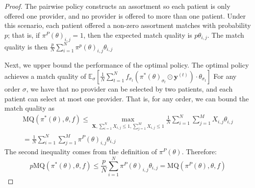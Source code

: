 \documentclass[11pt]{article}
\begin{document}
\begin{proof}
     
    The pairwise policy constructs an assortment so each patient is only offered one provider, and no provider is offered to more than one patient. 
    Under this scenario, each patient offered a non-zero assortment matches with probability $p$; that is, if $\pi^{P}(\theta)_{i,j}=1$, then the expected match quality is $p \theta_{i,j}$. 
    The match quality is then $\frac{p}{N} \sum_{i=1}^{N} \pi^{p}(\theta)_{i,j} \theta_{i,j}$

    Next, we upper bound the performance of the optimal policy.
    The optimal policy achieves a match quality of 
    $\mathbb{E}_{\sigma}[\frac{1}{N} \sum_{t=1}^{N} f_{\sigma_{t}}\left(\pi^{*}(\theta)_{\sigma_{t}} \odot \mathbf{y}^{(t)}\right)  \cdot \theta_{\sigma_{t}}]$
    For any order $\sigma$, we have that no provider can be selected by two patients, and each patient can select at most one provider. 
    That is, for any order, we can bound the match quality as 
    \begin{align}
        \mathrm{MQ}(\pi^{*}(\theta),\theta,f) \leq \max\limits_{\mathbf{X}, \sum_{i=1}^{N} X_{i,j} \leq 1, \sum_{j=1}^{M} X_{i,j} \leq 1} \frac{1}{N} \sum_{i=1}^{N} \sum_{j=1}^{M} X_{i,j} \theta_{i,j} \\ = \frac{1}{N} \sum_{i=1}^{N} \sum_{j=1}^{M} \pi^{P}(\theta)_{i,j} \theta_{i,j}
    \end{align}
    The second inequality comes from the definition of $\pi^{P}(\theta)$. 
    Therefore: 
    \begin{equation}
        p\mathrm{MQ}(\pi^{*}(\theta),\theta,f)\leq \frac{p}{N} \sum_{i=1}^{N} \pi^{P}(\theta)_{i,j} \theta_{i,j} =  \mathrm{MQ}(\pi^{P}(\theta),\theta,f)
    \end{equation}
\end{proof}
\end{document}
